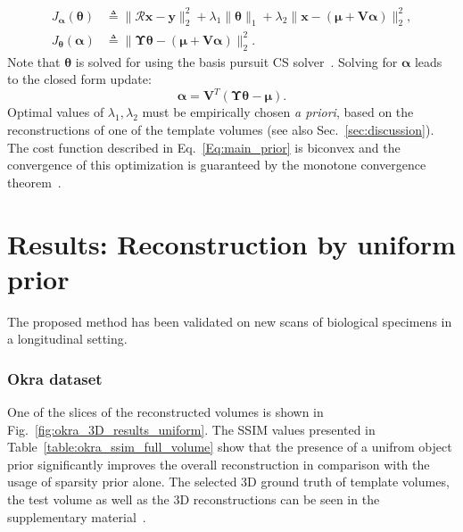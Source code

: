 \documentclass[journal]{IEEEtran}
\begin{document}
\begin{align}
J_{\boldsymbol{\alpha}}(\boldsymbol{\theta}) &\triangleq \lVert\boldsymbol{\mathcal{R} x- y}\rVert_2^2  + \lambda_1\lVert\boldsymbol{\theta}\rVert_1+\lambda_2\lVert\boldsymbol{x} - (\boldsymbol{\mu + V\alpha})\rVert_2^2, \\
J_{\boldsymbol\theta}(\boldsymbol{\alpha}) &\triangleq \lVert\boldsymbol{\Upsilon\theta} - (\boldsymbol{\mu + V\alpha})\rVert_2^2.
\end{align}
Note that $\boldsymbol{\theta}$ is solved for using the basis pursuit CS solver~\cite{l1ls}. Solving for $\boldsymbol{\alpha}$ leads to the closed form update:
\begin{equation}
\boldsymbol{\boldsymbol{\alpha}} = \boldsymbol{V}^T(\boldsymbol{\Upsilon \theta} -\boldsymbol{\mu}).
\end{equation}
 Optimal values of $\lambda_1, \lambda_2$ must be empirically chosen \textit{a priori}, based on the reconstructions of one of the template volumes (see also Sec.~\ref{sec:discussion}). The cost function described in Eq.~\ref{Eq:main_prior} is biconvex and the convergence of this optimization is guaranteed by the monotone convergence theorem~\cite{monotone}.
 \vspace{2mm}

 \section{Results: Reconstruction by uniform prior}
 \label{sec:results_uniform_prior}

 
 The proposed method has been validated on new scans of biological
 specimens in a longitudinal setting. 

\subsubsection{\textbf{Okra dataset}}
\label{Sec:okra_uniform}
 One of the slices of the reconstructed volumes is shown in
 Fig.~\ref{fig:okra_3D_results_uniform}. The SSIM values presented in
 Table~\ref{table:okra_ssim_full_volume} show that the presence of a
 unifrom object prior significantly improves the overall
 reconstruction in comparison with the usage of sparsity prior alone.
 The selected 3D ground truth of template volumes, the test volume as
 well as the 3D reconstructions can be seen in the supplementary
 material~\cite{supp_paper}.
\end{document}
